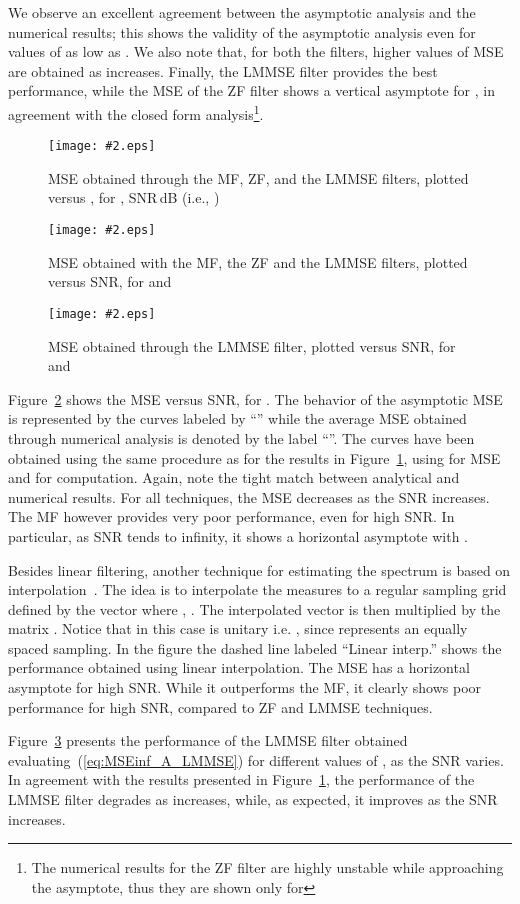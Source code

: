 \documentclass[final, a4paper]{IEEEtran}
\newcommand{\insertfig}[4]{
\begin{figure}[tbh]
\centerline{\texttt{[image: \#2.eps]}}
\vspace{-0.3cm}
\caption{#3}\label{#4}\end{figure}}
\begin{document}
We observe an excellent agreement between the asymptotic analysis
and the numerical results; this shows the validity of the asymptotic
analysis even for values of  as low as .
We also note that, for both the filters, higher values of MSE are obtained as 
increases. Finally, the LMMSE
filter provides the best performance, while the MSE of the ZF filter
shows a vertical asymptote for , in agreement
with the closed form analysis\footnote{The numerical results for the
ZF filter are highly unstable while approaching the asymptote, thus
they are shown only for }.

\insertfig{1.00}{MSE_model_A_0}{MSE obtained through the MF, ZF, and the LMMSE filters,
plotted versus , for , SNR\,dB (i.e., )}{fig:MSE_model_A_0}

\insertfig{1.00}{MSE_model_A_1}{MSE obtained with the MF, the ZF and the LMMSE filters,
plotted versus SNR, for  and }{fig:MSE_model_A_1}
\insertfig{1.00}{MSE_model_A_2}{MSE obtained through the LMMSE filter,
plotted versus SNR, for  and }{fig:MSE_model_A_2}

Figure~\ref{fig:MSE_model_A_1} shows the MSE versus SNR, for .
The behavior of the asymptotic MSE is represented by the curves labeled by
``'' while the average MSE obtained through numerical analysis is denoted by
the label ``''. The curves have been obtained using the same procedure as for
the results in Figure~\ref{fig:MSE_model_A_0}, using  for MSE and  for  computation.
Again, note the tight match between analytical and numerical results.
For all techniques, the MSE decreases as the SNR increases.
The MF however provides very poor performance, even for high SNR. In particular, as
SNR tends to infinity, it shows a horizontal asymptote with .

Besides linear filtering, another technique for estimating the spectrum  is based on
interpolation~\cite{DongTong}.
The idea is to interpolate the measures  to a regular sampling grid defined by the vector
 where , . The interpolated vector  is then multiplied
by the matrix . Notice that in this case  is unitary i.e.
, since  represents an equally spaced sampling.
In the figure the dashed line labeled ``Linear interp.'' shows the performance obtained using linear interpolation. The MSE has a horizontal asymptote for high SNR. While it outperforms
the MF, it clearly shows poor performance for high SNR, compared to ZF and LMMSE techniques.


Figure~\ref{fig:MSE_model_A_2} presents the performance of the LMMSE filter obtained
evaluating~(\ref{eq:MSEinf_A_LMMSE}) for different values of ,
as the SNR varies.
In agreement with the results presented in Figure~\ref{fig:MSE_model_A_0},
the performance of the LMMSE filter
degrades as  increases, while, as expected, it improves as
the SNR increases.
\end{document}
